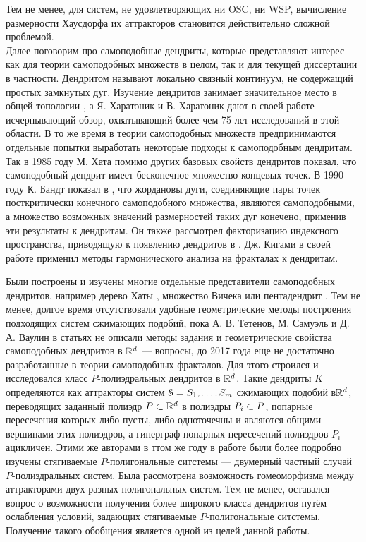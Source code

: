 Тем не менее, для систем, не удовлетворяющих ни OSC, ни WSP, вычисление размерности Хаусдорфа их аттракторов становится действительно сложной проблемой.\\

Далее поговорим про самоподобные дендриты, которые представляют интерес как для теории самоподобных множеств в целом, так и для текущей диссертации в частности.
Дендритом называют локально связный континуум, не содержащий простых замкнутых дуг.
Изучение дендритов занимает значительное место в общей топологии \cite{Kur1, Kur2}, а Я. Харатоник и В. Харатоник дают в своей работе \cite{Char1998} исчерпывающий обзор, охватывающий более чем 75 лет исследований в этой области.
В то же время в теории самоподобных множеств предпринимаются отдельные попытки выработать некоторые подходы к самоподобным дендритам.
Так в 1985 году М. Хата \cite{Hata1985} помимо других базовых свойств дендритов показал, что самоподобный дендрит имеет бесконечное множество концевых точек.
В 1990 году К. Бандт показал в \cite{SSS6}, что жордановы дуги, соединяющие пары точек посткритически конечного самоподобного множества, являются самоподобными, а множество возможных значений размерностей таких дуг конечено, применив эти результаты к дендритам.
Он также рассмотрел факторизацию индексного пространства, приводящую к появлению дендритов в \cite{SSS2}.
Дж. Кигами в своей работе \cite{Kig95} применил методы гармонического анализа на фракталах к дендритам. 

Были построены и изучены многие отдельные представители самоподобных дендритов, например дерево Хаты \cite{Hata1985}, множество Вичека или пентадендрит \cite{McWorter1987}.
Тем не менее, долгое время отсутствовали удобные геометрические методы построения подходящих систем сжимающих подобий, пока А. В. Тетенов, М. Самуэль и Д. А. Ваулин в статьях \cite{TSV2017} не описали методы задания и геометрические свойства самоподобных дендритов в $\mathbb{R}^d$ --- вопросы, до 2017 года еще не достаточно разработанные в теории самоподобных фракталов. 
Для этого строился и исследовался класс $P$-полиэдральных дендритов в $\mathbb{R}^d$. 
Такие дендриты $K$ определяются как аттракторы систем ${\EuScript S} = {S_1,\ldots, S_m}$ сжимающих подобий в$\mathbb{R}^d$, переводящих заданный полиэдр $P \subset \mathbb{R}^d$ в полиэдры $P_i \subset P$, попарные пересечения которых либо пусты, либо одноточечны и являются общими вершинами этих полиэдров, а гиперграф попарных пересечений полиэдров $P_i$ ацикличен.
Этими же авторами в ттом же году в работе \cite{STV2017} были более подробно изучены стягиваемые $P$-полигональные ситстемы --- двумерный частный случай $P$-полиэдральных систем.
Была рассмотрена возможность гомеоморфизма между аттракторами двух разных полигональных систем.
Тем не менее, оставался вопрос о возможности получения более широкого класса дендритов путём ослабления условий, задающих стягиваемые $P$-полигональные ситстемы. 
Получение такого обобщения является одной из целей данной работы.

